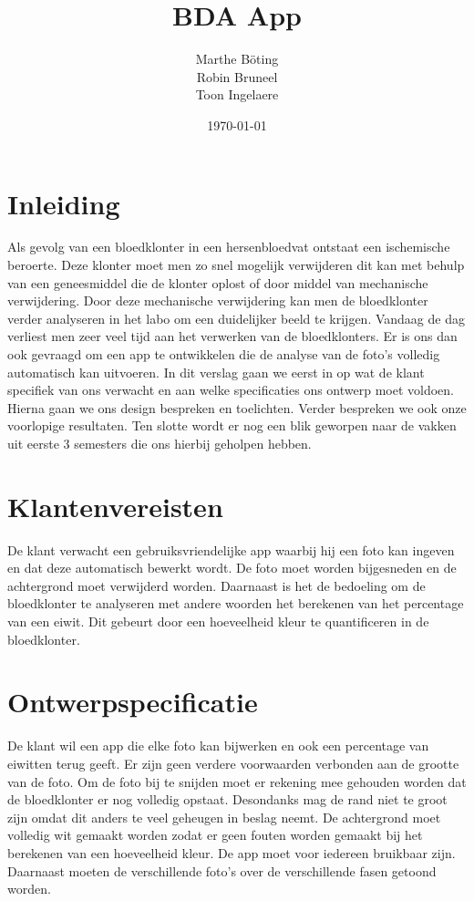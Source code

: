 \documentclass[a4paper,kulak]{kulakarticle}
\date{\today}
\title{BDA App}
\author{Marthe B\"{o}ting\\
	Robin Bruneel\\
	Toon Ingelaere}
\begin{document}
	
	\newpage
	\maketitle
	\tableofcontents
	\newpage
	
	\section*{Inleiding}	
		Als gevolg van een bloedklonter in een hersenbloedvat ontstaat een ischemische beroerte. Deze klonter moet men zo snel mogelijk verwijderen dit kan met behulp van een geneesmiddel die de klonter oplost of door middel van mechanische verwijdering. Door deze mechanische verwijdering kan men de bloedklonter verder analyseren in het labo om een duidelijker beeld te krijgen.
		\newline
		Vandaag de dag verliest men zeer veel tijd aan het verwerken van de bloedklonters. Er is ons dan ook gevraagd om een app te ontwikkelen die de analyse van de foto’s volledig automatisch kan uitvoeren.
		\newline
		In dit verslag gaan we eerst in op wat de klant specifiek van ons verwacht en aan welke specificaties ons ontwerp moet voldoen. Hierna gaan we ons design bespreken en toelichten. Verder bespreken we ook onze voorlopige resultaten. Ten slotte wordt er nog een blik geworpen naar de vakken uit eerste 3 semesters die ons hierbij geholpen hebben.
	
	\section{Klantenvereisten}
		De klant verwacht een gebruiksvriendelijke app waarbij hij een foto kan ingeven en dat deze automatisch bewerkt wordt. De foto moet  worden bijgesneden en de achtergrond moet verwijderd worden. Daarnaast is het de bedoeling om de bloedklonter te analyseren met andere woorden het berekenen van het percentage van een eiwit. Dit gebeurt door een hoeveelheid kleur te quantificeren in de bloedklonter. 
	
	\section{Ontwerpspecificatie}
		De klant wil een app die elke foto kan bijwerken en ook een percentage van eiwitten terug geeft. Er zijn geen verdere voorwaarden verbonden aan de grootte van de foto. Om de foto bij te snijden moet er rekening mee gehouden worden dat de bloedklonter er nog volledig opstaat. Desondanks mag de rand niet te groot zijn omdat dit anders te veel geheugen in beslag neemt. De achtergrond moet volledig wit gemaakt worden zodat er geen fouten worden gemaakt bij het berekenen van een hoeveelheid kleur. De app moet voor iedereen bruikbaar zijn. Daarnaast moeten de verschillende foto's over de verschillende fasen getoond worden. 
		
\end{document}
